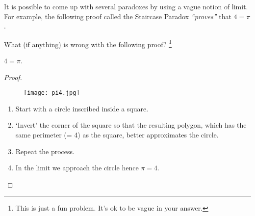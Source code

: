 It is possible to come up with several paradoxes by using a vague notion of limit. For example, the following proof called the Staircase Paradox {\it ``proves''} that $4 = \pi$.
\begin{exercise}
	What (if anything) is wrong with the following proof? \footnote{This is just a fun problem. It's ok to be vague in your answer.}
	\begin{claim} $4 = \pi$.
	\end{claim}
	\begin{proof}
		\begin{figure}[H]
			\centering
			\texttt{[image: pi4.jpg]}
		\end{figure}
		\begin{enumerate}
			\item
			      Start with a circle inscribed inside a square.
			\item
			      `Invert' the corner of the square so that the resulting polygon, which has the same perimeter (= 4) as the square, better approximates the circle.
			\item Repeat the process.
			\item In the limit we approach the circle hence $\pi = 4$.
		\end{enumerate}
	\end{proof}

\end{exercise}
